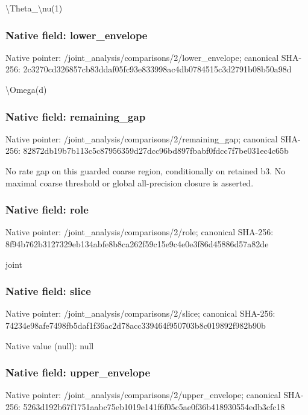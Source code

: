 \documentclass[10pt,a4paper]{article}
\begin{document}
\begingroup\raggedright\sloppy \textbackslash{}Theta\_\allowbreak{}\textbackslash{}nu(1)\par\endgroup

\subsubsection{Native field: lower\_\allowbreak{}envelope}
Native pointer: /joint\_\allowbreak{}analysis/comparisons/2/lower\_\allowbreak{}envelope; canonical SHA-256: 2c3270cd326857cb83ddaf05fc93e833998ac4db0784515c3d2791b08b50a98d

\begingroup\raggedright\sloppy \textbackslash{}Omega(d)\par\endgroup

\subsubsection{Native field: remaining\_\allowbreak{}gap}
Native pointer: /joint\_\allowbreak{}analysis/comparisons/2/remaining\_\allowbreak{}gap; canonical SHA-256: 82872db19b7b113c5c87956359d27dcc96bd897fbabf0fdcc7f7be031ec4c65b

\begingroup\raggedright\sloppy No rate gap on this guarded coarse region,\allowbreak{} conditionally on retained b3. No maximal coarse threshold or global all-precision closure is asserted.\par\endgroup

\subsubsection{Native field: role}
Native pointer: /joint\_\allowbreak{}analysis/comparisons/2/role; canonical SHA-256: 8f94b762b3127329eb134abfe8b8ca262f59c15e9c4e0e3f86d45886d57a82de

\begingroup\raggedright\sloppy joint\par\endgroup

\subsubsection{Native field: slice}
Native pointer: /joint\_\allowbreak{}analysis/comparisons/2/slice; canonical SHA-256: 74234e98afe7498fb5daf1f36ac2d78acc339464f950703b8c019892f982b90b

Native value (null): null

\subsubsection{Native field: upper\_\allowbreak{}envelope}
Native pointer: /joint\_\allowbreak{}analysis/comparisons/2/upper\_\allowbreak{}envelope; canonical SHA-256: 5263d192b67f1751aabc75eb1019e141f6f05c5ae0f36b418930554edb3cfc18
\end{document}
